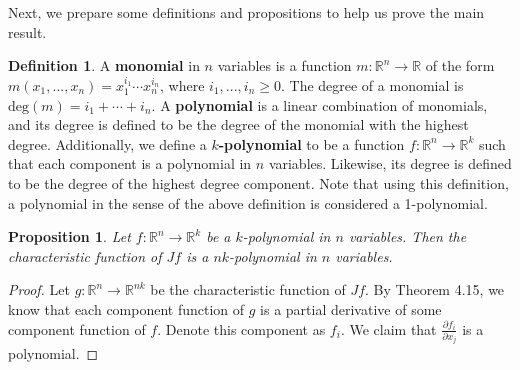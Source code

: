 \documentclass{article}
\theoremstyle{plain} %
\numberwithin{thm}{section} %
\newtheorem{prop}[thm]{Proposition}
\theoremstyle{definition}
\newtheorem{defn}[thm]{Definition}
\begin{document}
    Next, we prepare some definitions and propositions to help us prove the main result.
    \begin{defn}
        A \textbf{monomial} in \(n\) variables is a function \(m : \mathbb{R}^n \to \mathbb{R}\) of the form \(m(x_1, ..., x_n) = x_1^{i_1}\cdots x_n^{i_n}\), where \(i_1, ..., i_n \geq 0\). The degree of a monomial is \(\mathrm{deg} (m) = i_1 + \cdots + i_n\). A \textbf{polynomial} is a linear combination of monomials, and its degree is defined to be the degree of the monomial with the highest degree. Additionally, we define a \textbf{\(k\)-polynomial} to be a function \(f: \mathbb{R}^n \to \mathbb{R}^k\) such that each component is a polynomial in \(n\) variables. Likewise, its degree is defined to be the degree of the highest degree component. Note that using this definition, a polynomial in the sense of the above definition is considered a 1-polynomial.
    \end{defn}
    \begin{prop}
        Let \(f: \mathbb{R}^n \to \mathbb{R}^k\) be a \(k\)-polynomial in \(n\) variables. Then the characteristic function of \(Jf\) is a \(nk\)-polynomial in \(n\) variables.
    \end{prop}
    \begin{proof}
        Let \(g: \mathbb{R}^n \to \mathbb{R}^{nk}\) be the characteristic function of \(Jf\). By Theorem 4.15, we know that each component function of \(g\) is a partial derivative of some component function of \(f\). Denote this component as \(f_i\). We claim that \(\frac{\partial f_i}{\partial x_j}\) is a polynomial.
    \end{proof}

\end{document}
